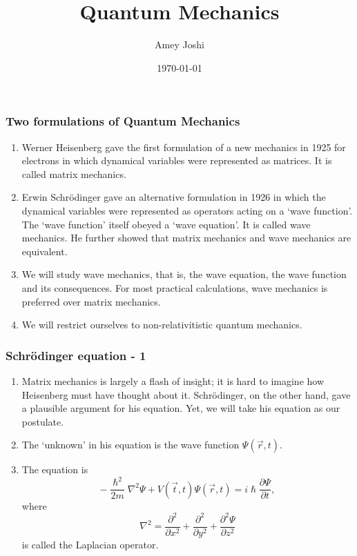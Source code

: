 \documentclass{beamer}
\title{Quantum Mechanics}
\author{Amey Joshi}
\date{\today}
\begin{document}
\begin{frame}
\titlepage
\end{frame}

\begin{frame}
\frametitle{Two formulations of Quantum Mechanics}
\begin{enumerate}
\item Werner Heisenberg gave the first formulation of a new mechanics in 1925 
for electrons in which dynamical variables were represented as matrices. It is 
called matrix mechanics.
\item Erwin Schr\"{o}dinger gave an alternative formulation in 1926 in which
the dynamical variables were represented as operators acting on a `wave 
function'. The `wave function' itself obeyed a `wave equation'. It is called
wave mechanics. He further showed that matrix mechanics and wave mechanics are
equivalent.
\item We will study wave mechanics, that is, the wave equation, the wave 
function and its consequences. For most practical calculations, wave mechanics
is preferred over matrix mechanics.
\item We will restrict ourselves to non-relativitistic quantum mechanics.
\end{enumerate}
\end{frame}

\begin{frame}
\frametitle{Schr\"{o}dinger equation - 1}
\begin{enumerate}
\item Matrix mechanics is largely a flash of insight; it is hard to imagine how
Heisenberg must have thought about it. Schr\"{o}dinger, on the other hand, gave
a plausible argument for his equation. Yet, we will take his equation as our
postulate.
\item The `unknown' in his equation is the wave function $\Psi(\vec{r}, t)$.
\item The equation is
\begin{equation}\label{e1}
-\frac{\hslash^2}{2m}\nabla^2\Psi + V(\vec{t},t)\Psi(\vec{r}, t) = 
i\hslash\frac{\partial\Psi}{\partial t},
\end{equation}
where
\begin{equation}\label{e2}
\nabla^2 = \frac{\partial^2}{\partial x^2} + \frac{\partial^2}{\partial y^2} + 
\frac{\partial^2\Psi}{\partial z^2} 
\end{equation}
is called the Laplacian operator.
\end{enumerate}
\end{frame}
\end{document}

